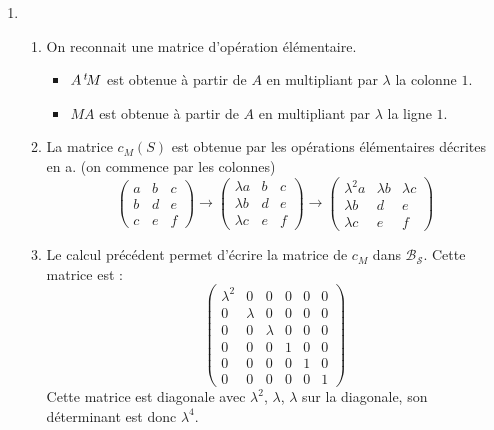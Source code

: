 \begin{enumerate}
\item  \begin{enumerate}
 \item On reconnait une matrice d'opération élémentaire.
\begin{itemize}
 \item $A\,\mathstrut^t\! M$ est obtenue à partir de $A$ en multipliant par $\lambda$ la colonne $1$.
 \item $M A$ est obtenue à partir de $A$ en multipliant par $\lambda$ la ligne $1$.
\end{itemize}
\item La matrice $c_M(S)$ est obtenue par les opérations élémentaires décrites en a. (on commence par les colonnes)
\begin{displaymath}
\begin{pmatrix}
 a & b & c \\ b & d & e \\ c & e & f
\end{pmatrix}
\rightarrow
\begin{pmatrix}
 \lambda a & b & c \\ \lambda b & d & e \\ \lambda c & e & f
\end{pmatrix}
\rightarrow
\begin{pmatrix}
 \lambda^2 a & \lambda b & \lambda c \\ \lambda b & d & e \\ \lambda c & e & f
\end{pmatrix}
\end{displaymath}
\item Le calcul précédent permet d'écrire la matrice de $c_M$ dans $\mathcal B_{\mathcal S}$. Cette matrice est :
\begin{displaymath}
 \begin{pmatrix}
\lambda^2 & 0       & 0       & 0 & 0 & 0 \\ 
0         & \lambda & 0       & 0 & 0 & 0 \\ 
0         & 0       & \lambda & 0 & 0 & 0 \\ 
0         & 0       & 0       & 1 & 0 & 0 \\ 
0         & 0       & 0       & 0 & 1 & 0 \\ 
0         & 0       & 0       & 0 & 0 & 1 
 \end{pmatrix}
\end{displaymath}
Cette matrice est diagonale avec $\lambda^2$, $\lambda$, $\lambda$ sur la diagonale, son déterminant est donc $\lambda^4$.
\begin{displaymath}

\end{displaymath}
\end{enumerate}
\end{enumerate}
